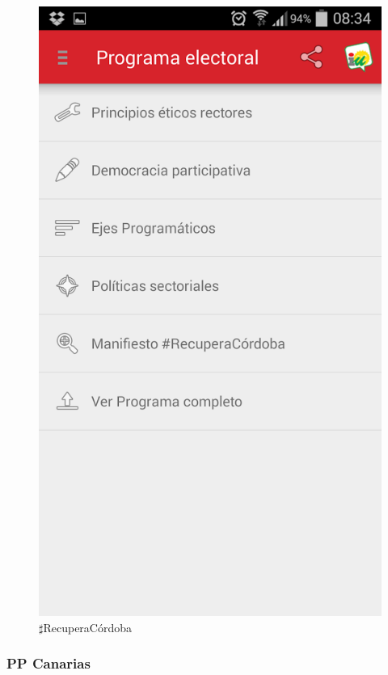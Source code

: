 	\begin{figure}[H]
      \centering
	\includegraphics[keepaspectratio, scale=0.35]{Media/Captures/IURecuperaCordoba.png}
      \caption{$\sharp$RecuperaCórdoba}
      \label{fig:recuperacordoba}
    \end{figure}
    
    	\subsubsection{PP Canarias}\label{sssec:pp_canarias}
    	
